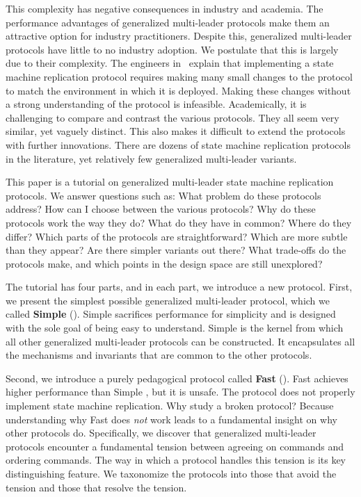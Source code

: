 This complexity has negative consequences in industry and academia. The
performance advantages of generalized multi-leader protocols make them an
attractive option for industry practitioners. Despite this, generalized
multi-leader protocols have little to no industry adoption.  We postulate that
this is largely due to their complexity. The engineers
in~\cite{chandra2007paxos} explain that implementing a state machine
replication protocol requires making many small changes to the protocol to
match the environment in which it is deployed. Making these changes without a
strong understanding of the protocol is infeasible. Academically, it is
challenging to compare and contrast the various protocols. They all seem very
similar, yet vaguely distinct. This also makes it difficult to extend the
protocols with further innovations. There are dozens of state machine
replication protocols in the literature, yet relatively few generalized
multi-leader variants.

This paper is a tutorial on generalized multi-leader state machine replication
protocols. We answer questions such as: What problem do these protocols
address? How can I choose between the various protocols? Why do these protocols
work the way they do? What do they have in common? Where do they differ? Which
parts of the protocols are straightforward? Which are more subtle than they
appear? Are there simpler variants out there? What trade-offs do the protocols
make, and which points in the design space are still unexplored?

The tutorial has four parts, and in each part, we introduce a new protocol.
First, we present the simplest possible generalized multi-leader protocol,
which we called \textbf{Simple \BPaxos{}} (). Simple
\BPaxos{} sacrifices performance for simplicity and is designed with the sole
goal of being easy to understand.  Simple \BPaxos{} is the kernel from which
all other generalized multi-leader protocols can be constructed. It
encapsulates all the mechanisms and invariants that are common to the other
protocols.

Second, we introduce a purely pedagogical protocol called \textbf{Fast
\BPaxos{}} (). Fast \BPaxos{} achieves higher performance
than Simple \BPaxos{}, but it is unsafe. The protocol does not properly
implement state machine replication. Why study a broken protocol? Because
understanding why Fast \BPaxos{} does \emph{not} work leads to a fundamental
insight on why other protocols do. Specifically, we discover that generalized
multi-leader protocols encounter a fundamental tension between agreeing on
commands and ordering commands. The way in which a protocol handles this
tension is its key distinguishing feature. We taxonomize the protocols into
those that avoid the tension and those that resolve the tension.

